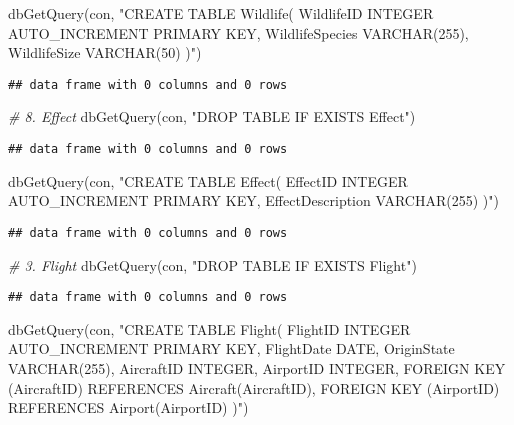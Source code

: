 \documentclass[
]{article}
\newenvironment{Shaded}{\begin{snugshade}}{\end{snugshade}}
\newcommand{\CommentTok}[1]{\textcolor[rgb]{0.56,0.35,0.01}{\textit{#1}}}
\newcommand{\FunctionTok}[1]{\textcolor[rgb]{0.00,0.00,0.00}{#1}}
\newcommand{\NormalTok}[1]{#1}
\newcommand{\StringTok}[1]{\textcolor[rgb]{0.31,0.60,0.02}{#1}}
\begin{document}
\begin{Shaded}
\begin{Highlighting}[]
\FunctionTok{dbGetQuery}\NormalTok{(con, }\StringTok{"CREATE TABLE Wildlife(}
\StringTok{    WildlifeID INTEGER AUTO\_INCREMENT PRIMARY KEY,}
\StringTok{    WildlifeSpecies VARCHAR(255),}
\StringTok{    WildlifeSize VARCHAR(50)}
\StringTok{)"}\NormalTok{)}
\end{Highlighting}
\end{Shaded}

\begin{verbatim}
## data frame with 0 columns and 0 rows
\end{verbatim}

\begin{Shaded}
\begin{Highlighting}[]
\CommentTok{\# 8. Effect}
\FunctionTok{dbGetQuery}\NormalTok{(con, }\StringTok{"DROP TABLE IF EXISTS Effect"}\NormalTok{)}
\end{Highlighting}
\end{Shaded}

\begin{verbatim}
## data frame with 0 columns and 0 rows
\end{verbatim}

\begin{Shaded}
\begin{Highlighting}[]
\FunctionTok{dbGetQuery}\NormalTok{(con, }\StringTok{"CREATE TABLE Effect(}
\StringTok{    EffectID INTEGER AUTO\_INCREMENT PRIMARY KEY,}
\StringTok{    EffectDescription VARCHAR(255)}
\StringTok{)"}\NormalTok{)}
\end{Highlighting}
\end{Shaded}

\begin{verbatim}
## data frame with 0 columns and 0 rows
\end{verbatim}

\begin{Shaded}
\begin{Highlighting}[]
\CommentTok{\# 3. Flight}
\FunctionTok{dbGetQuery}\NormalTok{(con, }\StringTok{"DROP TABLE IF EXISTS Flight"}\NormalTok{)}
\end{Highlighting}
\end{Shaded}

\begin{verbatim}
## data frame with 0 columns and 0 rows
\end{verbatim}

\begin{Shaded}
\begin{Highlighting}[]
\FunctionTok{dbGetQuery}\NormalTok{(con, }\StringTok{"CREATE TABLE Flight(}
\StringTok{    FlightID INTEGER AUTO\_INCREMENT PRIMARY KEY,}
\StringTok{    FlightDate DATE,}
\StringTok{    OriginState VARCHAR(255),}
\StringTok{    AircraftID INTEGER,}
\StringTok{    AirportID INTEGER,}
\StringTok{    FOREIGN KEY (AircraftID) REFERENCES Aircraft(AircraftID),}
\StringTok{    FOREIGN KEY (AirportID) REFERENCES Airport(AirportID)}
\StringTok{)"}\NormalTok{)}
\end{Highlighting}
\end{Shaded}
\end{document}
